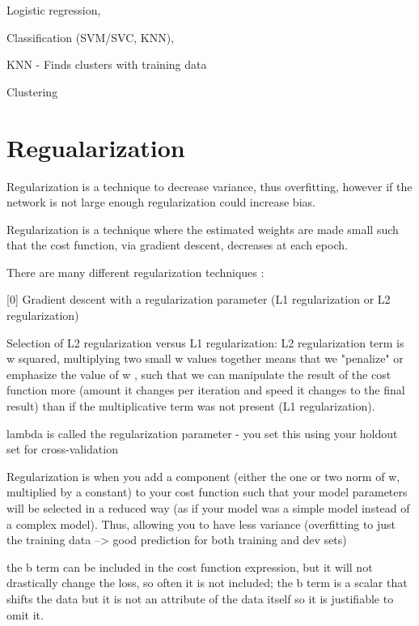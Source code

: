 \documentclass[11pt, onecolumn]{article}
\begin{document}
Logistic regression, 



Classification (SVM/SVC, KNN), 

KNN 
	- Finds clusters with training data




Clustering



\section{Regualarization}

Regularization is a technique to decrease variance, thus overfitting, however if the network is not large enough regularization could increase bias.

Regularization is a technique where the estimated weights are made small such that the cost function, via gradient descent, decreases at each epoch. 


There are many different regularization techniques :

[0] Gradient descent with a regularization parameter (L1 regularization or L2 regularization)

Selection of L2 regularization versus L1 regularization: L2 regularization term is w squared, multiplying two small w values together means that we "penalize" or emphasize the value of w , such that we can manipulate the result of the cost function more (amount it changes per iteration and speed it changes to the final result) than if the multiplicative term was not present (L1 regularization). 

lambda is called the regularization parameter - you set this using your holdout set for cross-validation

Regularization is when you add a component (either the one or two norm of w, multiplied by a constant) to your cost function such that your model parameters will be selected in a reduced way (as if your model was a simple model instead of a complex model).  Thus, allowing you to have less variance (overfitting to just the training data --> good prediction for both training and dev sets)

the b term can be included in the cost function expression, but it will not drastically change the loss, so often it is not included; the b term is a scalar that shifts the data but it is not an attribute of the data itself so it is justifiable to omit it.
\end{document}

